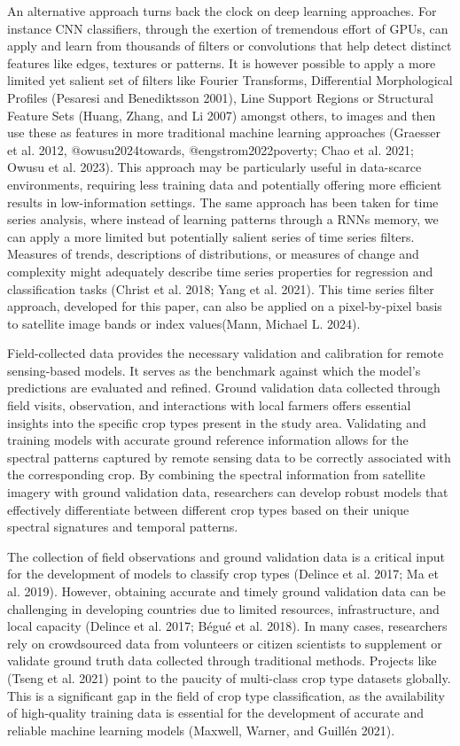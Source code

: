 \documentclass[
  journal,
  twocolumn]{IEEEtran}
\begin{document}
An alternative approach turns back the clock on deep learning
approaches. For instance CNN classifiers, through the exertion of
tremendous effort of GPUs, can apply and learn from thousands of filters
or convolutions that help detect distinct features like edges, textures
or patterns. It is however possible to apply a more limited yet salient
set of filters like Fourier Transforms, Differential Morphological
Profiles (Pesaresi and Benediktsson 2001), Line Support Regions or
Structural Feature Sets (Huang, Zhang, and Li 2007) amongst others, to
images and then use these as features in more traditional machine
learning approaches (Graesser et al. 2012, @owusu2024towards,
@engstrom2022poverty; Chao et al. 2021; Owusu et al. 2023). This
approach may be particularly useful in data-scarce environments,
requiring less training data and potentially offering more efficient
results in low-information settings. The same approach has been taken
for time series analysis, where instead of learning patterns through a
RNNs memory, we can apply a more limited but potentially salient series
of time series filters. Measures of trends, descriptions of
distributions, or measures of change and complexity might adequately
describe time series properties for regression and classification tasks
(Christ et al. 2018; Yang et al. 2021). This time series filter
approach, developed for this paper, can also be applied on a
pixel-by-pixel basis to satellite image bands or index values(Mann,
Michael L. 2024).

Field-collected data provides the necessary validation and calibration
for remote sensing-based models. It serves as the benchmark against
which the model's predictions are evaluated and refined. Ground
validation data collected through field visits, observation, and
interactions with local farmers offers essential insights into the
specific crop types present in the study area. Validating and training
models with accurate ground reference information allows for the
spectral patterns captured by remote sensing data to be correctly
associated with the corresponding crop. By combining the spectral
information from satellite imagery with ground validation data,
researchers can develop robust models that effectively differentiate
between different crop types based on their unique spectral signatures
and temporal patterns.

The collection of field observations and ground validation data is a
critical input for the development of models to classify crop types
(Delince et al. 2017; Ma et al. 2019). However, obtaining accurate and
timely ground validation data can be challenging in developing countries
due to limited resources, infrastructure, and local capacity (Delince et
al. 2017; Bégué et al. 2018). In many cases, researchers rely on
crowdsourced data from volunteers or citizen scientists to supplement or
validate ground truth data collected through traditional methods.
Projects like (Tseng et al. 2021) point to the paucity of multi-class
crop type datasets globally. This is a significant gap in the field of
crop type classification, as the availability of high-quality training
data is essential for the development of accurate and reliable machine
learning models (Maxwell, Warner, and Guillén 2021).
\end{document}
